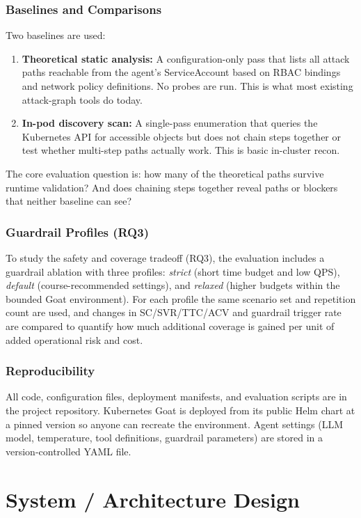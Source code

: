 \documentclass[conference]{IEEEtran}
\begin{document}
\subsubsection{Baselines and Comparisons}
Two baselines are used:
\begin{enumerate}
    \item \textbf{Theoretical static analysis:} A configuration-only pass that lists all attack paths reachable from the agent's ServiceAccount based on RBAC bindings and network policy definitions. No probes are run. This is what most existing attack-graph tools do today.
    \item \textbf{In-pod discovery scan:} A single-pass enumeration that queries the Kubernetes API for accessible objects but does not chain steps together or test whether multi-step paths actually work. This is basic in-cluster recon.
\end{enumerate}

The core evaluation question is: how many of the theoretical paths survive runtime validation? And does chaining steps together reveal paths or blockers that neither baseline can see?

\subsubsection{Guardrail Profiles (RQ3)}
To study the safety and coverage tradeoff (RQ3), the evaluation includes a guardrail ablation with three profiles: \emph{strict} (short time budget and low QPS), \emph{default} (course-recommended settings), and \emph{relaxed} (higher budgets within the bounded Goat environment). For each profile the same scenario set and repetition count are used, and changes in SC/SVR/TTC/ACV and guardrail trigger rate are compared to quantify how much additional coverage is gained per unit of added operational risk and cost.

\subsubsection{Reproducibility}
All code, configuration files, deployment manifests, and evaluation scripts are in the project repository. Kubernetes Goat is deployed from its public Helm chart at a pinned version so anyone can recreate the environment. Agent settings (LLM model, temperature, tool definitions, guardrail parameters) are stored in a version-controlled YAML file.

\section{System / Architecture Design}
\end{document}
